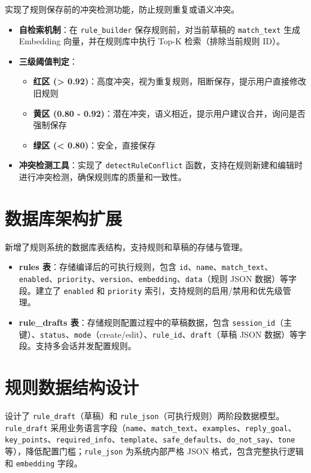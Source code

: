 \documentclass[UTF8]{ctexart}
\begin{document}
实现了规则保存前的冲突检测功能，防止规则重复或语义冲突。

\begin{itemize}
    \item \textbf{自检索机制}：在 \texttt{rule\_builder} 保存规则前，对当前草稿的 \texttt{match\_text} 生成 Embedding 向量，并在规则库中执行 Top-K 检索（排除当前规则 ID）。
    \item \textbf{三级阈值判定}：
    \begin{itemize}
        \item \textbf{红区 (> 0.92)}：高度冲突，视为重复规则，阻断保存，提示用户直接修改旧规则
        \item \textbf{黄区 (0.80 - 0.92)}：潜在冲突，语义相近，提示用户建议合并，询问是否强制保存
        \item \textbf{绿区 (< 0.80)}：安全，直接保存
    \end{itemize}
    \item \textbf{冲突检测工具}：实现了 \texttt{detectRuleConflict} 函数，支持在规则新建和编辑时进行冲突检测，确保规则库的质量和一致性。
\end{itemize}

\section{数据库架构扩展}

新增了规则系统的数据库表结构，支持规则和草稿的存储与管理。

\begin{itemize}
    \item \textbf{rules 表}：存储编译后的可执行规则，包含 \texttt{id}、\texttt{name}、\texttt{match\_text}、\texttt{enabled}、\texttt{priority}、\texttt{version}、\texttt{embedding}、\texttt{data}（规则 JSON 数据）等字段。建立了 \texttt{enabled} 和 \texttt{priority} 索引，支持规则的启用/禁用和优先级管理。
    \item \textbf{rule\_drafts 表}：存储规则配置过程中的草稿数据，包含 \texttt{session\_id}（主键）、\texttt{status}、\texttt{mode}（create/edit）、\texttt{rule\_id}、\texttt{draft}（草稿 JSON 数据）等字段。支持多会话并发配置规则。
\end{itemize}

\section{规则数据结构设计}

设计了 \texttt{rule\_draft}（草稿）和 \texttt{rule\_json}（可执行规则）两阶段数据模型。\texttt{rule\_draft} 采用业务语言字段（\texttt{name}、\texttt{match\_text}、\texttt{examples}、\texttt{reply\_goal}、\texttt{key\_points}、\texttt{required\_info}、\texttt{template}、\texttt{safe\_defaults}、\texttt{do\_not\_say}、\texttt{tone} 等），降低配置门槛；\texttt{rule\_json} 为系统内部严格 JSON 格式，包含完整执行逻辑和 \texttt{embedding} 字段。
\end{document}
